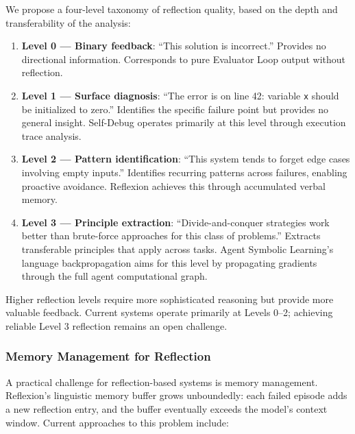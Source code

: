 We propose a four-level taxonomy of reflection quality, based on the depth and transferability of the analysis:

\begin{enumerate}
    \item \textbf{Level 0 --- Binary feedback}: ``This solution is incorrect.'' Provides no directional information. Corresponds to pure Evaluator Loop output without reflection.

    \item \textbf{Level 1 --- Surface diagnosis}: ``The error is on line 42: variable \texttt{x} should be initialized to zero.'' Identifies the specific failure point but provides no general insight. Self-Debug operates primarily at this level through execution trace analysis.

    \item \textbf{Level 2 --- Pattern identification}: ``This system tends to forget edge cases involving empty inputs.'' Identifies recurring patterns across failures, enabling proactive avoidance. Reflexion achieves this through accumulated verbal memory.

    \item \textbf{Level 3 --- Principle extraction}: ``Divide-and-conquer strategies work better than brute-force approaches for this class of problems.'' Extracts transferable principles that apply across tasks. Agent Symbolic Learning's language backpropagation aims for this level by propagating gradients through the full agent computational graph.
\end{enumerate}

Higher reflection levels require more sophisticated reasoning but provide more valuable feedback. Current systems operate primarily at Levels 0--2; achieving reliable Level 3 reflection remains an open challenge.

\subsubsection{Memory Management for Reflection}

A practical challenge for reflection-based systems is memory management. Reflexion's linguistic memory buffer grows unboundedly: each failed episode adds a new reflection entry, and the buffer eventually exceeds the model's context window. Current approaches to this problem include:


